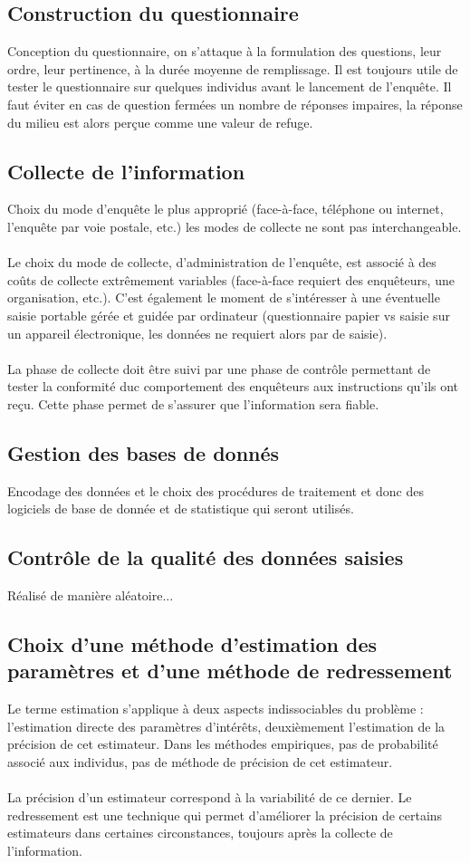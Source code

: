 \documentclass{article}
\begin{document}
\subsection{Construction du questionnaire} Conception du questionnaire, on s'attaque à la formulation des questions, leur ordre, leur pertinence, à la durée moyenne de remplissage. Il est toujours utile de tester le questionnaire sur quelques individus avant le lancement de l'enquête. Il faut éviter en cas de question fermées un nombre de réponses impaires, la réponse du milieu est alors perçue comme une valeur de refuge.
\subsection{Collecte de l'information} Choix du mode d'enquête le plus approprié (face-à-face, téléphone ou internet, l'enquête par voie postale, etc.) les modes de collecte ne sont pas interchangeable. \\ \\
Le choix du mode de collecte, d'administration de l'enquête, est associé à des coûts de collecte extrêmement variables (face-à-face requiert des enquêteurs, une organisation, etc.). C'est également le moment de s'intéresser à une éventuelle saisie portable gérée et guidée par ordinateur (questionnaire papier vs saisie sur un appareil électronique, les données ne requiert alors par de saisie). \\ \\
La phase de collecte doit être suivi par une phase de contrôle permettant de tester la conformité duc comportement des enquêteurs aux instructions qu'ils ont reçu. Cette phase permet de s'assurer que l'information sera fiable. 
\subsection{Gestion des bases de donnés} Encodage des données et le choix des procédures de traitement et donc des logiciels de base de donnée et de statistique qui seront utilisés.
\subsection{Contrôle de la qualité des données saisies} Réalisé de manière aléatoire...
\subsection{Choix d'une méthode d'estimation des paramètres et d'une méthode de redressement} Le terme estimation s'applique à deux aspects indissociables du problème : l'estimation directe des paramètres d'intérêts, deuxièmement l'estimation de la précision de cet estimateur. Dans les méthodes empiriques, pas de probabilité associé aux individus, pas de méthode de précision de cet estimateur. \\ \\
La précision d'un estimateur correspond à la variabilité de ce dernier. Le redressement est une technique qui permet d'améliorer la précision de certains estimateurs dans certaines circonstances, toujours après la collecte de l'information.
\end{document}
